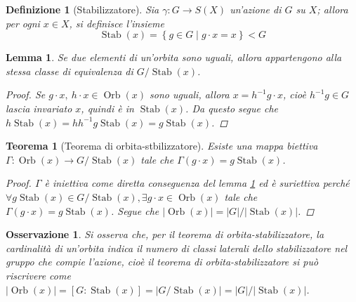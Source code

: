 \documentclass[11pt]{scrartcl}
\theoremstyle{style1}
\newtheorem{osservazione}{Osservazione}[section]
\newtheorem{teorema}{Teorema}[section]
\newtheorem{lemma}{Lemma}[teorema]
\newtheorem{definizione}{Definizione}[section]
\numberwithin{equation}{subsection}
\begin{document}
\begin{definizione}
	[Stabilizzatore]
	Sia $\gamma: G \to S(X)$ un'azione di $G$ su $X$; allora per ogni $x \in X$, si definisce l'insieme 
	\[
	\operatorname{Stab} (x) = \left\{ g \in G  \mid g \cdot  x = x \right\} < G 
	\] 	
\end{definizione}
\begin{lemma}\label{l111}
Se due elementi di un'orbita sono uguali, allora appartengono alla stessa classe di equivalenza di $G / \operatorname{Stab} (x)$.
\begin{proof}
	Se $g \cdot x, \ h\cdot x \in \operatorname{Orb} (x)$ sono uguali, allora $x =h^{-1} g \cdot x $, cio\`e $h^{-1} g \in G$ lascia invariato $x$, quindi \`e in $\operatorname{Stab} (x)$.
	Da questo segue che $h \operatorname{Stab} (x) = h h^{-1} g \operatorname{Stab} (x) = g \operatorname{Stab} (x)$.
\end{proof}
\end{lemma}
\begin{teorema}[Teorema di orbita-stbilizzatore]\label{osth}
	Esiste una mappa biettiva $\Gamma : \operatorname{Orb} (x) \to G / \operatorname{Stab} (x)$ tale che $\Gamma(g \cdot x) = g \operatorname{Stab} (x)$.
	\begin{proof}
		$\Gamma$ \`e iniettiva come diretta conseguenza del lemma \ref{l111} ed \`e suriettiva perch\'e $\forall g \operatorname{Stab} (x) \in G / \operatorname{Stab} (x), \exists g\cdot x \in \operatorname{Orb} (x)$ tale che $\Gamma(g\cdot x) = g \operatorname{Stab} (x)$.
		Segue che $\lvert \operatorname{Orb} (x)  \rvert = \lvert G \rvert / \lvert \operatorname{Stab} (x) \rvert $.
	\end{proof}
\end{teorema}
\begin{osservazione}
Si osserva che, per il teorema di orbita-stabilizzatore, la cardinalit\`a di un'orbita indica il numero di classi laterali dello stabilizzatore nel gruppo che compie l'azione, cio\`e il teorema di orbita-stabilizzatore si pu\`o riscrivere come $\lvert \operatorname{Orb} (x) \rvert = [G: \operatorname{Stab} (x)] = \lvert G / \operatorname{Stab} (x) \rvert = \lvert G \rvert / \lvert \operatorname{Stab} (x) \rvert $.
\end{osservazione}
\end{document}
